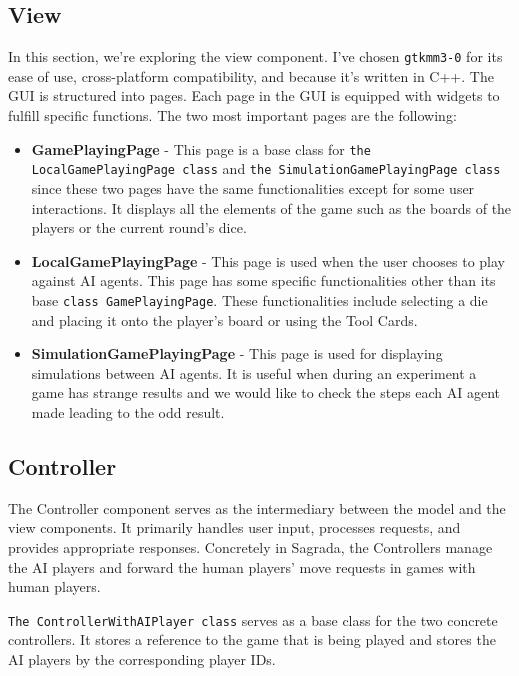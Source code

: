 \subsection{View}

In this section, we're exploring the view component. I've chosen \texttt{gtkmm3-0} for its ease of use, cross-platform compatibility, and because it's written in C++.
The GUI is structured into pages. Each page in the GUI is equipped with widgets to fulfill specific functions. The two most important pages are the following:
\begin{itemize}
    \item \textbf{GamePlayingPage} - This page is a base class for \texttt{the LocalGamePlayingPage class} and \texttt{the SimulationGamePlayingPage class} 
    since these two pages have the same functionalities except for some user interactions. It displays all the elements of the game such as the boards 
    of the players or the current round's dice.
    \item \textbf{LocalGamePlayingPage} - This page is used when the user chooses to play against AI agents. This page has some specific functionalities 
    other than its base \texttt{class GamePlayingPage}.  These functionalities include selecting a die and placing it onto the player's board or using the Tool Cards.
    \item \textbf{SimulationGamePlayingPage} - This page is used for displaying simulations between AI agents. It is useful when during an experiment a game
    has strange results and we would like to check the steps each AI agent made leading to the odd result.
\end{itemize}



\subsection{Controller}

The Controller component serves as the intermediary between the model and the view components. It primarily handles user input, processes requests, 
and provides appropriate responses. Concretely in Sagrada, the Controllers manage the AI players and forward the human players' move requests in games with human players.

\texttt{The ControllerWithAIPlayer class} serves as a base class for the two concrete controllers.
It stores a reference to the game that is being played and stores the AI players by the corresponding player IDs. 

